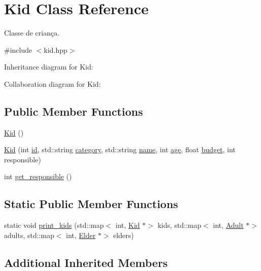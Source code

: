 \hypertarget{class_kid}{}\section{Kid Class Reference}
\label{class_kid}


Classe de criança.  




{\ttfamily \#include $<$kid.\+hpp$>$}



Inheritance diagram for Kid\+:


Collaboration diagram for Kid\+:
\subsection*{Public Member Functions}
\begin{DoxyCompactItemize}
\item 
\hyperlink{class_kid_a853cac010b91c16bf7a21c8f2ea7fbfa}{Kid} ()
\item 
\hyperlink{class_kid_a881c2e60104c76968f7b58fc4c485ed6}{Kid} (int \hyperlink{class_user_aa7e6e39b43020bbe9c3a196b3689b0f7}{id}, std\+::string \hyperlink{class_user_a4216a4a01d8b3b036de85c5238d79cea}{category}, std\+::string \hyperlink{class_user_a085d8d69282b6298964eab8351584536}{name}, int \hyperlink{class_user_aa5829689588d1f982e1a69b73bd68655}{age}, float \hyperlink{class_user_a9c4a23a62f53b4c1c289c27785a5868f}{budget}, int responsible)
\item 
int \hyperlink{class_kid_a9bdb175dea42c7ce02baf00ec9cbd1c5}{get\+\_\+responsible} ()
\end{DoxyCompactItemize}
\subsection*{Static Public Member Functions}
\begin{DoxyCompactItemize}
\item 
static void \hyperlink{class_kid_a1212830ec9b7107178036f767f865e32}{print\+\_\+kids} (std\+::map$<$ int, \hyperlink{class_kid}{Kid} $\ast$$>$ kids, std\+::map$<$ int, \hyperlink{class_adult}{Adult} $\ast$$>$ adults, std\+::map$<$ int, \hyperlink{class_elder}{Elder} $\ast$$>$ elders)
\end{DoxyCompactItemize}
\subsection*{Additional Inherited Members}


